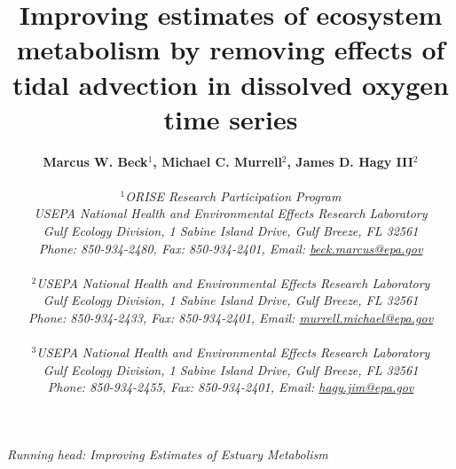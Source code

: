 \begin{singlespace}
\title{{\bf {\Large Improving estimates of ecosystem metabolism by removing effects of tidal advection in dissolved oxygen time series}}}
\author{
  {\bf {\normalsize Marcus W. Beck$^1$, Michael C. Murrell$^2$, James D. Hagy III$^2$}}
  \\\\{\textit {\normalsize $^1$ORISE Research Participation Program}}
  \\{\textit {\normalsize USEPA National Health and Environmental Effects Research Laboratory}}
	\\{\textit {\normalsize Gulf Ecology Division, 1 Sabine Island Drive, Gulf Breeze, FL 32561}}
	\\{\textit {\normalsize Phone: 850-934-2480, Fax: 850-934-2401, Email: \href{mailto:beck.marcus@epa.gov}{beck.marcus@epa.gov}}}
  \\\\{\textit {\normalsize $^2$USEPA National Health and Environmental Effects Research Laboratory}}
	\\{\textit {\normalsize Gulf Ecology Division, 1 Sabine Island Drive, Gulf Breeze, FL 32561}}
	\\{\textit {\normalsize Phone: 850-934-2433, Fax: 850-934-2401, Email: \href{mailto:murrell.michael@epa.gov}{murrell.michael@epa.gov}}}
  \\\\{\textit {\normalsize $^3$USEPA National Health and Environmental Effects Research Laboratory}}
	\\{\textit {\normalsize Gulf Ecology Division, 1 Sabine Island Drive, Gulf Breeze, FL 32561}}
	\\{\textit {\normalsize Phone: 850-934-2455, Fax: 850-934-2401, Email: \href{mailto:hagy.jim@epa.gov}{hagy.jim@epa.gov}}}
	}
\date{}
\maketitle
\vfill{\centerline{\textit {\normalsize Running head: Improving Estimates of Estuary Metabolism}}}
\end{singlespace}
\clearpage